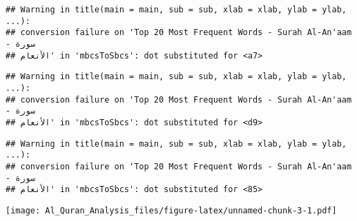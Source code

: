 \documentclass[]{article}
\begin{document}
\begin{verbatim}
## Warning in title(main = main, sub = sub, xlab = xlab, ylab = ylab, ...):
## conversion failure on 'Top 20 Most Frequent Words - Surah Al-An'aam - سورة
## الأنعام' in 'mbcsToSbcs': dot substituted for <a7>
\end{verbatim}

\begin{verbatim}
## Warning in title(main = main, sub = sub, xlab = xlab, ylab = ylab, ...):
## conversion failure on 'Top 20 Most Frequent Words - Surah Al-An'aam - سورة
## الأنعام' in 'mbcsToSbcs': dot substituted for <d9>
\end{verbatim}

\begin{verbatim}
## Warning in title(main = main, sub = sub, xlab = xlab, ylab = ylab, ...):
## conversion failure on 'Top 20 Most Frequent Words - Surah Al-An'aam - سورة
## الأنعام' in 'mbcsToSbcs': dot substituted for <85>
\end{verbatim}

\texttt{[image: Al\_Quran\_Analysis\_files/figure-latex/unnamed-chunk-3-1.pdf]}
\end{document}
